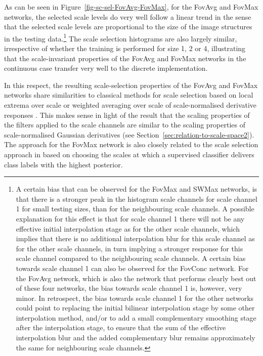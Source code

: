 \documentclass[twocolumn,runningheads]{svjour3}
\begin{document}
As can be seen in Figure~\ref{fig-sc-sel-FovAvg-FovMax}, for the FovAvg and FovMax networks, the selected scale levels do very well follow a linear trend  in the sense that the selected scale levels are proportional to the size of the image structures in the testing data.\footnote{A certain bias that can be observed for the FovMax and SWMax
networks, is that there is a stronger peak in the histogram scale channels for
scale channel 1 for small testing sizes, than for the neighbouring
scale channels. A possible explanation for this effect is that for
scale channel 1 there will not be any effective initial interpolation stage as
for the other scale channels, which implies that there is no
additional interpolation blur for this scale channel as for the other scale channels, in turn implying a stronger
response for this scale channel compared to the neighbouring scale
channels. A certain bias towards scale channel 1 can also be observed
for the FovConc network. For the FovAvg network, which is also the
network that performs clearly best out of these four networks, the
bias towards scale channel 1 is, however, very minor. In retrospect,
the bias towards scale channel 1 for the other networks could point to
replacing the initial bilinear interpolation stage by some other
interpolation method, and/or to add a small complementary smoothing stage after
the interpolation stage, to ensure that the sum of the effective interpolation blur
and the added complementary blur remains approximately the same for neighbouring
scale channels.}
The scale selection histograms are also largely similar, irrespective
of whether the training is performed for size 1, 2 or 4, illustrating
that the scale-invariant properties of the FovAvg and FovMax networks in the
continuous case transfer very well to the discrete implementation.

In this respect, the resulting scale-selection properties of the
FovAvg and FovMax networks share similarities to classical methods for
scale selection based on local extrema over scale or weighted
averaging over scale of scale-normalised derivative responses
\cite{Lin97-IJCV,Lin98-IJCV,Lin12-JMIV,Lin15-JMIV,Lin21-EncCompVis}. This makes sense in light of the result that the scaling properties of
the filters applied to the scale channels are similar to the scaling
properties of scale-normalised Gaussian derivatives (see  Section~\ref{sec:relation-to-scale-space2}). The
approach for the FovMax network is also closely related to the scale
selection approach in \cite{LooLiTax09-LNCS,LiTaxLoo12-IVC} based on choosing the scales at which a supervised
classifier delivers class labels with the highest posterior.
\end{document}
